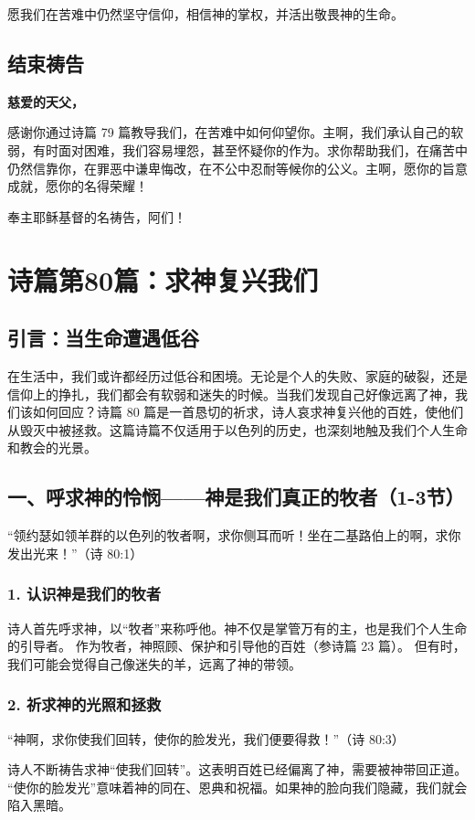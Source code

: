 \documentclass[a4paper, 12pt]{article}
\begin{document}
愿我们在苦难中仍然坚守信仰，相信神的掌权，并活出敬畏神的生命。

\subsection*{结束祷告}

\textbf{慈爱的天父，}

感谢你通过诗篇 79 篇教导我们，在苦难中如何仰望你。主啊，我们承认自己的软弱，有时面对困难，我们容易埋怨，甚至怀疑你的作为。求你帮助我们，在痛苦中仍然信靠你，在罪恶中谦卑悔改，在不公中忍耐等候你的公义。主啊，愿你的旨意成就，愿你的名得荣耀！

奉主耶稣基督的名祷告，阿们！
\newpage
\section{诗篇第80篇：求神复兴我们}
\subsection*{引言：当生命遭遇低谷}
在生活中，我们或许都经历过低谷和困境。无论是个人的失败、家庭的破裂，还是信仰上的挣扎，我们都会有软弱和迷失的时候。当我们发现自己好像远离了神，我们该如何回应？诗篇 80 篇是一首恳切的祈求，诗人哀求神复兴他的百姓，使他们从毁灭中被拯救。这篇诗篇不仅适用于以色列的历史，也深刻地触及我们个人生命和教会的光景。

\subsection*{一、呼求神的怜悯——神是我们真正的牧者（1-3节）}
“领约瑟如领羊群的以色列的牧者啊，求你侧耳而听！坐在二基路伯上的啊，求你发出光来！”（诗 80:1）

\subsubsection*{1. 认识神是我们的牧者}
诗人首先呼求神，以“牧者”来称呼他。神不仅是掌管万有的主，也是我们个人生命的引导者。
作为牧者，神照顾、保护和引导他的百姓（参诗篇 23 篇）。
但有时，我们可能会觉得自己像迷失的羊，远离了神的带领。
\subsubsection*{2. 祈求神的光照和拯救}
“神啊，求你使我们回转，使你的脸发光，我们便要得救！”（诗 80:3）

诗人不断祷告求神“使我们回转”。这表明百姓已经偏离了神，需要被神带回正道。
“使你的脸发光”意味着神的同在、恩典和祝福。如果神的脸向我们隐藏，我们就会陷入黑暗。
\end{document}
